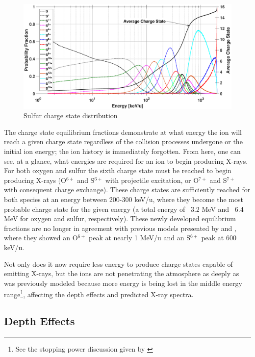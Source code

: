 \documentclass[draft]{agujournal2018}
\begin{document}
\begin{figure}[ht]
    \centering
    \includegraphics[width=\textwidth]{Figures/CSDsul.eps}
    \caption{Sulfur charge state distribution}
    \label{fig:CSDsul}
\end{figure}

The charge state equilibrium fractions demonstrate at what energy the ion will reach a given charge state regardless of the collision processes undergone or the initial ion energy; the ion history is immediately forgotten.
From here, one can see, at a glance, what energies are required for an ion to begin producing X-rays.
For both oxygen and sulfur the sixth charge state must be reached to begin producing X-rays (O$^{6+}$ and S$^{6+}$ with projectile excitation, or O$^{7+}$ and S$^{7+}$ with consequent charge exchange).
These charge states are sufficiently reached for both species at an energy between 200-300 keV/u, where they become the most probable charge state for the given energy (a total energy of ~3.2 MeV and ~6.4 MeV for oxygen and sulfur, respectively).
These newly developed equilibrium fractions are no longer in agreement with previous models presented by \citet{ozak2010} and \citet{houston2018}, where they showed an O$^{6+}$ peak at nearly 1 MeV/u and an S$^{6+}$ peak at 600 keV/u.

Not only does it now require less energy to produce charge states capable of emitting X-rays, but the ions are not penetrating the atmosphere as deeply as was previously modeled because more energy is being lost in the middle energy range\footnote{See the stopping power discussion given by \citet{schultz2018}}, affecting the depth effects and predicted X-ray spectra.

\subsection{Depth Effects}
\end{document}
